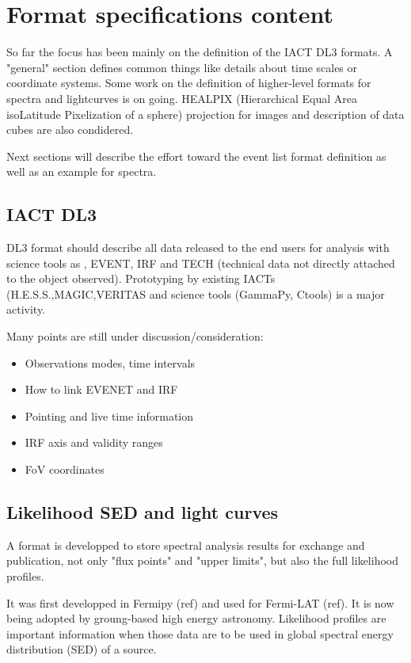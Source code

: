 \section{Format specifications content}

So far the focus has been mainly on the definition of the IACT DL3 formats.  A "general" section defines common things like details about time scales or coordinate systems. Some work on the definition of higher-level formats for spectra and lightcurves is on going. HEALPIX  (Hierarchical Equal Area isoLatitude Pixelization of a sphere) projection for images and  description of data cubes are also condidered.

Next sections will describe the effort toward the event list format definition as well as an example for spectra.

\subsection{IACT DL3}

DL3 format should describe all data released to the end users for analysis with science tools as , EVENT, IRF and TECH (technical data not directly attached to the object observed). Prototyping by existing IACTs (H.E.S.S.,MAGIC,VERITAS and science tools (GammaPy, Ctools) is a major activity. 

Many points are still under discussion/consideration:

\begin{itemize}
\item{}Observations modes, time intervals
\item{}How to link EVENET and IRF
\item{}Pointing and live time information
\item{}IRF axis and validity ranges
\item{}FoV coordinates
\end{itemize}

\subsection{Likelihood SED and light curves}

A format is developped to store spectral analysis results for exchange and publication, not only "flux points" and "upper limits", but also the full likelihood profiles. 

It was first developped in Fermipy (ref) and used for Fermi-LAT (ref). It is now being adopted by groung-based high energy astronomy. Likelihood profiles are important information when those data are to be used in global spectral energy distribution (SED) of a source. 

